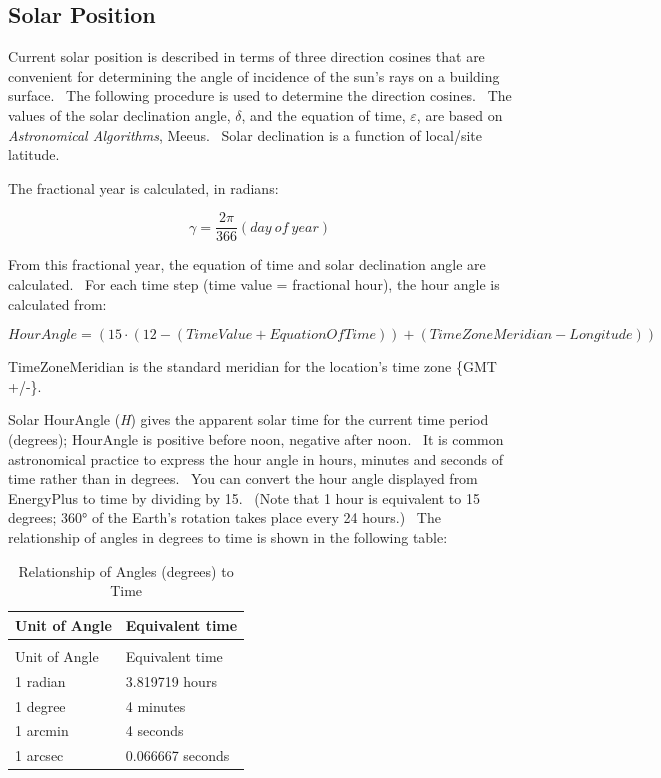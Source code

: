 \subsection{Solar Position}\label{solar-position}

Current solar position is described in terms of three direction cosines that are convenient for determining the angle of incidence of the sun's rays on a building surface.~ The following procedure is used to determine the direction cosines.~ The values of the solar declination angle, $\delta$, and the equation of time, $\varepsilon$, are based on \emph{Astronomical Algorithms}, Meeus.~ Solar declination is a function of local/site latitude.

The fractional year is calculated, in radians:

\begin{equation}
\gamma  = \frac{{2\pi }}{{366}}(day~of~year)
\end{equation}

From this fractional year, the equation of time and solar declination angle are calculated.~ For each time step (time value = fractional hour), the hour angle is calculated from:

\begin{equation}
HourAngle = \left( {15\cdot \left( {12 - \left( {TimeValue + EquationOfTime} \right)} \right) + \left( {TimeZoneMeridian - Longitude} \right)} \right)
\end{equation}

TimeZoneMeridian is the standard meridian for the location's time zone \{GMT +/-\}.

Solar HourAngle (\emph{H}) gives the apparent solar time for the current time period (degrees); HourAngle is positive before noon, negative after noon.~ It is common astronomical practice to express the hour angle in hours, minutes and seconds of time rather than in degrees.~ You can convert the hour angle displayed from EnergyPlus to time by dividing by 15.~ (Note that 1 hour is equivalent to 15 degrees; 360° of the Earth's rotation takes place every 24 hours.)~ The relationship of angles in degrees to time is shown in the following table:

\begin{longtable}[c]{@{}ll@{}}
\caption{Relationship of Angles (degrees) to Time \label{table:relationship-of-angles-degrees-to-time}} \tabularnewline
\toprule 
Unit of Angle & Equivalent time \tabularnewline
\midrule
\endfirsthead

\caption[]{Relationship of Angles (degrees) to Time} \tabularnewline
\toprule 
Unit of Angle & Equivalent time \tabularnewline
\midrule
\endhead

1 radian & 3.819719 hours \tabularnewline
1 degree & 4 minutes \tabularnewline
1 arcmin & 4 seconds \tabularnewline
1 arcsec & 0.066667 seconds \tabularnewline
\bottomrule
\end{longtable}

